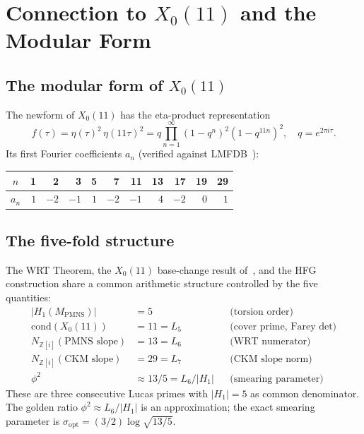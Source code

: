 \documentclass[11pt,a4paper]{article}
\theoremstyle{definition}
\newcommand{\MPMNS}{M_{\mathrm{PMNS}}}
\newcommand{\Zi}{\mathbb{Z}[i]}
\begin{document}
\section{Connection to $X_0(11)$ and the Modular Form}
\label{sec:x011}

\subsection{The modular form of $X_0(11)$}

The newform of $X_0(11)$ has the eta-product representation
\begin{equation}
f(\tau) = \eta(\tau)^2\,\eta(11\tau)^2
= q\prod_{n=1}^\infty (1-q^n)^2(1-q^{11n})^2,
\quad q = e^{2\pi i\tau}.
\label{eq:etaprod}
\end{equation}
Its first Fourier coefficients $a_n$ (verified against LMFDB~\cite{LMFDB}):
\begin{center}
\begin{tabular}{c|rrrrrrrrrr}
$n$ & 1 & 2 & 3 & 5 & 7 & 11 & 13 & 17 & 19 & 29 \\
\hline
$a_n$ & $1$ & $-2$ & $-1$ & $1$ & $-2$ & $-1$ & $4$ & $-2$ & $0$ & $1$
\end{tabular}
\end{center}

\subsection{The five-fold structure}

The WRT Theorem, the $X_0(11)$ base-change result of~\cite{Gentry:X011},
and the HFG construction share a common arithmetic structure
controlled by the five quantities:
\begin{align*}
|H_1(\MPMNS)| &= 5 &&\text{(torsion order)}\\
\text{cond}(X_0(11)) &= 11 = L_5 &&\text{(cover prime, Farey det)}\\
N_{\Zi}(\text{PMNS slope}) &= 13 = L_6 &&\text{(WRT numerator)}\\
N_{\Zi}(\text{CKM slope})  &= 29 = L_7 &&\text{(CKM slope norm)}\\
\phi^2 &\approx 13/5 = L_6/|H_1| &&\text{(smearing parameter)}
\end{align*}
These are three consecutive Lucas primes with $|H_1|=5$ as common denominator.
The golden ratio $\phi^2 \approx L_6/|H_1|$ is an approximation;
the exact smearing parameter is $\sigma_\mathrm{opt} = (3/2)\log\sqrt{13/5}$.
\end{document}
